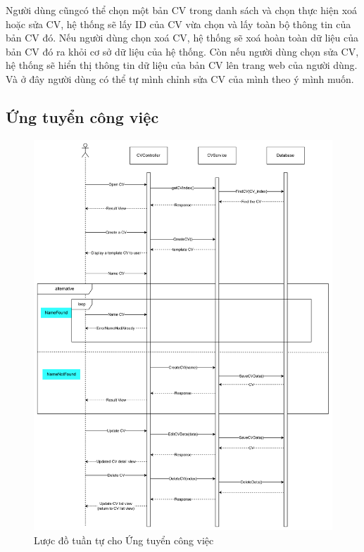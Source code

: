 Người dùng cũngcó thể  chọn một bản CV trong danh sách và chọn thực hiện xoá hoặc sửa CV, hệ thống sẽ lấy ID của CV vừa chọn và lấy toàn bộ thông tin của bản CV đó. Nếu người dùng chọn xoá CV, hệ thống sẽ xoá hoàn toàn dữ liệu của bản CV đó ra khỏi cơ sở dữ liệu của hệ thống. Còn nếu người dùng chọn sửa CV, hệ thống sẽ hiển thị thông tin dữ liệu của bản CV lên trang web của người dùng. Và ở đây người dùng có thể tự mình chỉnh sửa CV của mình theo ý mình muốn.


\subsection{Ứng tuyển công việc}

\begin{figure}[H]

	\centering
    \includegraphics[scale = 0.1]{img/ApplyJob_sequenceDiagram.png}
    \caption{Lược đồ tuần tự cho Ứng tuyển công việc}
	
\end{figure}

